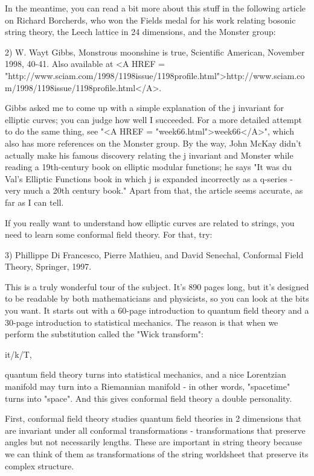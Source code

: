 In the meantime, you can read a bit more about this stuff in the
following article on Richard Borcherds, who won the Fields medal for his
work relating bosonic string theory, the Leech lattice in 24 dimensions,
and the Monster group:

2) W. Wayt Gibbs, Monstrous moonshine is true, Scientific American, November
1998, 40-41.  Also available at <A HREF = "http://www.sciam.com/1998/1198issue/1198profile.html">http://www.sciam.com/1998/1198issue/1198profile.html</A>.

Gibbs asked me to come up with a simple explanation of the j invariant
for elliptic curves; you can judge how well I succeeded.  For a more
detailed attempt to do the same thing, see "<A HREF = "week66.html">week66</A>", which also has more
references on the Monster group.  By the way, John McKay didn't actually
make his famous discovery relating the j invariant and Monster while
reading a 19th-century book on elliptic modular functions; he says
"It was du Val's Elliptic Functions book in which j is expanded 
incorrectly as a q-series - very much a 20th century book."  Apart from
that, the article seems accurate, as far as I can tell.

If you really want to understand how elliptic curves are related to strings, 
you need to learn some conformal field theory.   For that, try:

3) Phillippe Di Francesco, Pierre Mathieu, and David Senechal, Conformal
Field Theory, Springer, 1997.

This is a truly wonderful tour of the subject.   It's 890 pages long, but
it's designed to be readable by both mathematicians and physicists, so
you can look at the bits you want.  It starts out with a 60-page
introduction to quantum field theory and a 30-page introduction to 
statistical mechanics.  The reason is that when we perform the 
substitution called the "Wick transform":

                       it/\hbar  \to  k/T,

quantum field theory turns into statistical mechanics, and a nice
Lorentzian manifold may turn into a Riemannian manifold - in other
words, "spacetime" turns into "space".  And 
this gives conformal field theory a double personality.  

First, conformal field theory studies quantum field theories in 2
dimensions that are invariant under all conformal transformations -
transformations that preserve angles but not necessarily lengths.  These
are important in string theory because we can think of them as
transformations of the string worldsheet that preserve its complex
structure.   

